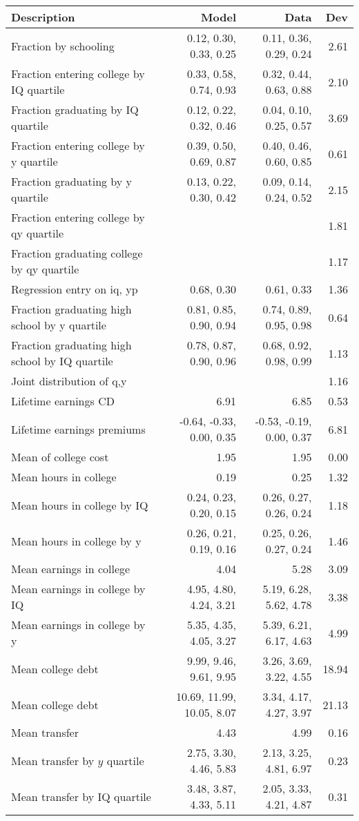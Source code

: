 \begin{tabular}{lrrr}
\hline
Description & Model  & Data  & Dev  \\ 
\hline
Fraction by schooling & 0.12, 0.30, 0.33, 0.25  & 0.11, 0.36, 0.29, 0.24  & 2.61  \\ 
Fraction entering college by IQ quartile & 0.33, 0.58, 0.74, 0.93  & 0.32, 0.44, 0.63, 0.88  & 2.10  \\ 
Fraction graduating by IQ quartile & 0.12, 0.22, 0.32, 0.46  & 0.04, 0.10, 0.25, 0.57  & 3.69  \\ 
Fraction entering college by y quartile & 0.39, 0.50, 0.69, 0.87  & 0.40, 0.46, 0.60, 0.85  & 0.61  \\ 
Fraction graduating by y quartile & 0.13, 0.22, 0.30, 0.42  & 0.09, 0.14, 0.24, 0.52  & 2.15  \\ 
Fraction entering college by qy quartile &   &   & 1.81  \\ 
Fraction graduating college by qy quartile &   &   & 1.17  \\ 
Regression entry on iq, yp & 0.68, 0.30  & 0.61, 0.33  & 1.36  \\ 
Fraction graduating high school by y quartile & 0.81, 0.85, 0.90, 0.94  & 0.74, 0.89, 0.95, 0.98  & 0.64  \\ 
Fraction graduating high school by IQ quartile & 0.78, 0.87, 0.90, 0.96  & 0.68, 0.92, 0.98, 0.99  & 1.13  \\ 
Joint distribution of q,y &   &   & 1.16  \\ 
Lifetime earnings CD & 6.91  & 6.85  & 0.53  \\ 
Lifetime earnings premiums & -0.64, -0.33, 0.00, 0.35  & -0.53, -0.19, 0.00, 0.37  & 6.81  \\ 
Mean of college cost & 1.95  & 1.95  & 0.00  \\ 
Mean hours in college & 0.19  & 0.25  & 1.32  \\ 
Mean hours in college by IQ & 0.24, 0.23, 0.20, 0.15  & 0.26, 0.27, 0.26, 0.24  & 1.18  \\ 
Mean hours in college by y & 0.26, 0.21, 0.19, 0.16  & 0.25, 0.26, 0.27, 0.24  & 1.46  \\ 
Mean earnings in college & 4.04  & 5.28  & 3.09  \\ 
Mean earnings in college by IQ & 4.95, 4.80, 4.24, 3.21  & 5.19, 6.28, 5.62, 4.78  & 3.38  \\ 
Mean earnings in college by y & 5.35, 4.35, 4.05, 3.27  & 5.39, 6.21, 6.17, 4.63  & 4.99  \\ 
Mean college debt & 9.99, 9.46, 9.61, 9.95  & 3.26, 3.69, 3.22, 4.55  & 18.94  \\ 
Mean college debt & 10.69, 11.99, 10.05, 8.07  & 3.34, 4.17, 4.27, 3.97  & 21.13  \\ 
Mean transfer & 4.43  & 4.99  & 0.16  \\ 
Mean transfer by $y$ quartile & 2.75, 3.30, 4.46, 5.83  & 2.13, 3.25, 4.81, 6.97  & 0.23  \\ 
Mean transfer by IQ quartile & 3.48, 3.87, 4.33, 5.11  & 2.05, 3.33, 4.21, 4.87  & 0.31  \\ 
\hline
\end{tabular}%
